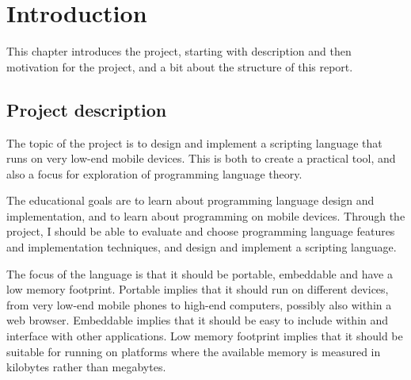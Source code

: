\documentclass[11pt]{report}
\begin{document}
\begin{comment}
\paragraph{Yolan source}
ok for now, maybe add other class
\paragraph{LightScript source}
Needs more comments. Maybe add other classes
\paragraph{Index}
MISSING. Walk through when other parts are less drafty
}
\end{comment}
\chapter{Introduction}
This chapter introduces the project, starting with description and then motivation for the project, and a bit about the structure of this report.


\section{Project description}
    The topic of the project is to design and implement a scripting language
that runs on very low-end mobile devices. This is both to create a practical tool, and
also a focus for exploration of programming language theory. 

\begin{comment}
The motivation is that a scripting language makes it is easier to make applications for mobile 
devices, and that existing freely available scripting languages
are very limited, slow, or simply does not run on the low-end mobile devices.
\end{comment}

    The educational goals are to learn about programming language design and
implementation, and to learn about programming on mobile devices. Through the
project, I should be able to evaluate and choose programming language features
and implementation techniques, and design and implement a scripting language.

    The focus of the language is that it should be portable, embeddable and have
a low memory footprint. Portable implies that it should run on different devices,
from very low-end mobile phones to high-end computers, possibly also within a web browser. 
Embeddable implies that it should be easy to include within and interface with
other applications. Low memory footprint implies that it should be suitable for
running on platforms where the available memory is measured in kilobytes rather
than megabytes. 
\end{document}
